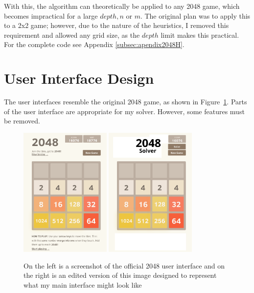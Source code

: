 \documentclass{article}
\begin{document}
With this, the algorithm can theoretically be applied to any 2048 game, which becomes impractical for a large $depth, n$ or $m$. The original plan was to apply this to a 2x2 game; however, due to the nature of the heuristics, I removed this requirement and allowed any grid size, as the $depth$ limit makes this practical. For the complete code see Appendix \ref{subsec:apendix2048H}.
\section{User Interface Design}
\label{sec:ui}

The user interfaces resemble the original 2048 game, as shown in Figure~\ref{fig:2048interface}.
Parts of the user interface are appropriate for my solver. However, some features must be removed.

\begin{figure}
    \centering
    \includegraphics[width=0.4\textwidth]{2048-interface.png}
    \includegraphics[width=0.4\textwidth]{interface-mockup.png}
    \caption{On the left is a screenshot of the official 2048 user interface \cite{game2048} and on the right
    is an edited version of this image designed to represent what my main interface might look like}
    \label{fig:2048interface}
\end{figure}
\end{document}
